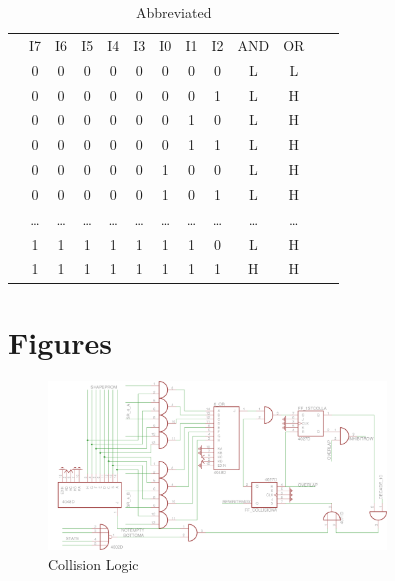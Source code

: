 \documentclass[letterpaper,titlepage,oneside]{article}
\begin{document}
\begin{center}
\begin{table}['h']
\begin{tabular}{c|c|c|c|c|c|c|c|c|c|c|c|c}
\cline{2-11}
& I7 & I6 & I5 & I4 & I3 & I0 & I1 & I2 & AND & OR \\ 
\cline{2-11}
& 0 & 0 & 0 & 0 & 0 & 0 & 0 & 0 & L & L  \\  
& 0 & 0 & 0 & 0 & 0 & 0 & 0 & 1 & L & H \\
& 0 & 0 & 0 & 0 & 0 & 0 & 1 & 0 & L & H \\
& 0 & 0 & 0 & 0 & 0 & 0 & 1 & 1 & L & H \\
& 0 & 0 & 0 & 0 & 0 & 1 & 0 & 0 & L & H \\
& 0 & 0 & 0 & 0 & 0 & 1 & 0 & 1 & L & H \\
& \ldots{} & \ldots{} & \ldots{} & \ldots{} & \ldots{} & \ldots{} & %
\ldots{} & \ldots{} & \ldots{} & \ldots{}\\
& 1 & 1 & 1 & 1 & 1 & 1 & 1 & 0 & L & H \\
& 1 & 1 & 1 & 1 & 1 & 1 & 1 & 1 & H & H \\
\cline{2-11}
\end{tabular}
\caption{Abbreviated}\label{8AndOr_Unminimized}
\end{table}
\end{center}


\pagebreak

\section{Figures}


\begin{center}
\begin{figure}[hp]
\centering
\includegraphics[width = 0.8\textwidth]{Circuit Diagrams/Collision Logic.png}
\caption{Collision Logic}
\label{fig:Collision}
\end{figure}
\end{center}
\end{document}

